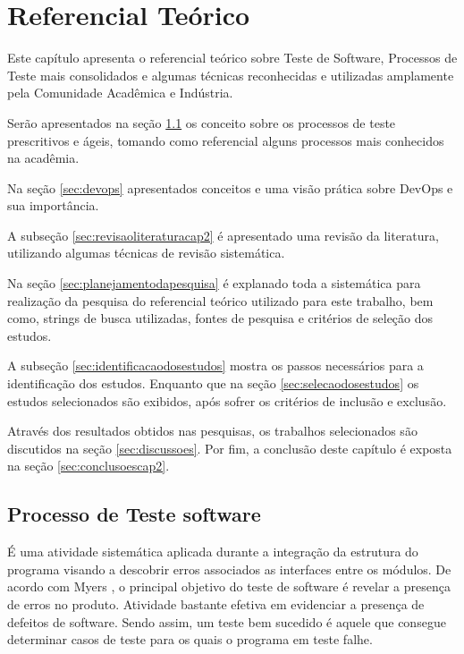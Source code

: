 \chapter{Referencial Teórico}
\label{sec:referencialteorico}

Este capítulo apresenta o referencial teórico sobre Teste de Software, Processos de Teste mais consolidados e algumas técnicas reconhecidas e utilizadas amplamente pela Comunidade Acadêmica e Indústria.

Serão apresentados na seção \ref{sec:processotestedesoftware} os conceito sobre os processos de teste prescritivos e ágeis, tomando como referencial alguns processos mais conhecidos na acadêmia.

Na seção \ref{sec:devops} apresentados conceitos e uma visão prática sobre DevOps e sua importância.

A subseção \ref{sec:revisaoliteraturacap2} é apresentado uma revisão da literatura, utilizando algumas técnicas de revisão sistemática.

Na seção \ref{sec:planejamentodapesquisa} é explanado toda a sistemática para realização da pesquisa do referencial teórico utilizado para este trabalho, bem como, strings de busca utilizadas, fontes de pesquisa e critérios de seleção dos estudos.

A subseção \ref{sec:identificacaodosestudos} mostra os passos necessários para a identificação dos estudos. Enquanto que na seção \ref{sec:selecaodosestudos} os estudos selecionados são exibidos, após sofrer os critérios de inclusão e exclusão.

Através dos resultados obtidos nas pesquisas, os trabalhos selecionados são discutidos na seção \ref{sec:discussoes}. Por fim, a conclusão deste capítulo é exposta na seção \ref{sec:conclusoescap2}.


\section{Processo de Teste software}
\label{sec:processotestedesoftware}

É uma atividade sistemática aplicada durante a integração da estrutura do programa visando a descobrir erros associados as interfaces entre os módulos. De acordo com Myers \cite{myers2004}, o principal objetivo do teste de software é revelar a presença de erros no produto. Atividade bastante efetiva em evidenciar a presença de defeitos de software. Sendo assim, um teste bem sucedido é aquele que consegue determinar casos de teste para os quais o programa em teste falhe.

